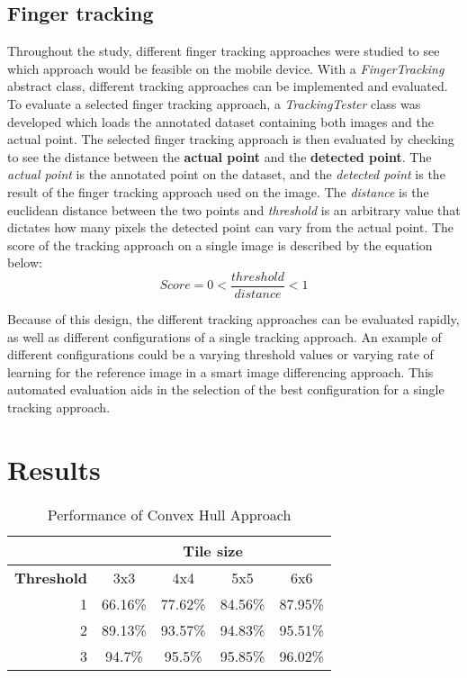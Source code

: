 \documentclass{acm_proc_article-sp}
\begin{document}
\subsection{Finger tracking}
\label{finger_tracking_evaluation}

Throughout the study, different finger tracking approaches were studied to see which approach would be feasible on the mobile device. With a \textit{FingerTracking} abstract class, different tracking approaches can be implemented and evaluated. To evaluate a selected finger tracking approach, a \textit{TrackingTester} class was developed which loads the annotated dataset containing both images and the actual point. The selected finger tracking approach is then evaluated by checking to see the distance between the \textbf{actual point} and the \textbf{detected point}. The \textit{actual point} is the annotated point on the dataset, and the \textit{detected point} is the result of the finger tracking approach used on the image. The \textit{distance} is the euclidean distance between the two points and \textit{threshold} is an arbitrary value that dictates how many pixels the detected point can vary from the actual point. The score of the tracking approach on a single image is described by the equation below:
\begin{equation}
Score = 0 < \frac{threshold}{distance} < 1
\end{equation}

Because of this design, the different tracking approaches can be evaluated rapidly, as well as different configurations of a single tracking approach. An example of different configurations could be a varying threshold values or varying rate of learning for the reference image in a smart image differencing approach. This automated evaluation aids in the selection of the best configuration for a single tracking approach.

\section{Results}



\begin{table}[h]
\centering
\caption{Performance of Convex Hull Approach}
\begin{tabular}{r|c|c|c|c|}
\cline{2-5}
\multicolumn{1}{c|}{}                    & \multicolumn{4}{c|}{\textbf{Tile size}} \\ \hline
\multicolumn{1}{|l|}{\textbf{Threshold}} & 3x3      & 4x4      & 5x5     & 6x6     \\ \hline
\multicolumn{1}{|r|}{1}                  & 66.16\%  & 77.62\%  & 84.56\% & 87.95\% \\ \hline
\multicolumn{1}{|r|}{2}                  & 89.13\%  & 93.57\%  & 94.83\% & 95.51\% \\ \hline
\multicolumn{1}{|r|}{3}                  & 94.7\%   & 95.5\%   & 95.85\% & 96.02\%   \\ \hline
\end{tabular}
\label{table:performance}
\end{table}
\end{document}
